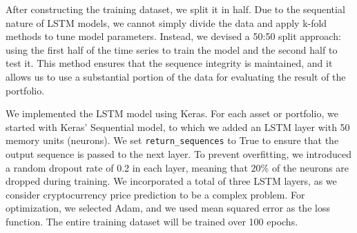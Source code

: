 \documentclass[journal, onecolumn]{IEEEtran}
\begin{document}
After constructing the training dataset, we split it in half. Due to the sequential nature of LSTM models, we cannot simply divide the data and apply k-fold methods to tune model parameters. Instead, we devised a 50:50 split approach: using the first half of the time series to train the model and the second half to test it. This method ensures that the sequence integrity is maintained, and it allows us to use a substantial portion of the data for evaluating the result of the portfolio.

We implemented the LSTM model using Keras. For each asset or portfolio, we started with Keras' Sequential model, to which we added an LSTM layer with 50 memory units (neurons). We set \texttt{return\_sequences} to True to ensure that the output sequence is passed to the next layer. To prevent overfitting, we introduced a random dropout rate of 0.2 in each layer, meaning that 20\% of the neurons are dropped during training. We incorporated a total of three LSTM layers, as we consider cryptocurrency price prediction to be a complex problem. For optimization, we selected Adam, and we used mean squared error as the loss function. The entire training dataset will be trained over 100 epochs.



\end{document}

